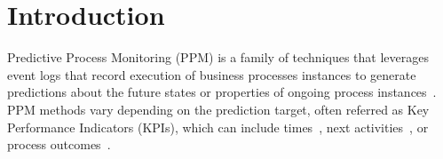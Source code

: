 \documentclass[manuscript,screen,review]{acmart}
\begin{document}




\maketitle

\section{Introduction}\label{sec:intro}
Predictive Process Monitoring (PPM) is a family of techniques that leverages event logs that record execution of business processes instances to generate predictions about the future states or properties of ongoing process instances~\cite{kimcommuzzi2022}. PPM methods vary depending on the prediction target, often referred as Key Performance Indicators (KPIs), which can include times~\cite{survey_remaining_time_verenich}, next activities~\cite{ceravoloss}, or process outcomes~\cite{outcome_oriented_teinemaa}. 
\end{document}
